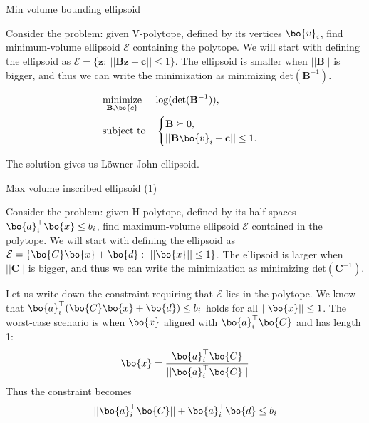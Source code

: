 \documentclass{beamer}
\begin{document}
\begin{frame}{Min volume bounding ellipsoid}
	\begin{flushleft}
		
		Consider the problem: given V-polytope, defined by its vertices $\bo{v}_i$, find minimum-volume ellipsoid $\mathcal{E}$ containing the polytope. We will start with defining the ellipsoid as $\mathcal{E} = \{ \mathbf{z}: \ || \mathbf{B}\mathbf{z} + \mathbf{c} || \leq 1 \}$. The ellipsoid is smaller when $|| \mathbf{B} ||$ is bigger, and thus we can write the minimization as minimizing $\text{det} (\mathbf{B}^{-1}) $.
		
\begin{equation}
	\begin{aligned}
		& \underset{\mathbf{B}, \bo{c}}{\text{minimize}}
		& & \text{log} (\text{det} (\mathbf{B}^{-1}) ), \\
		& \text{subject to}
		& & \begin{cases}
			\mathbf{B} \succeq 0, \\
			|| \mathbf{B} \bo{v}_i + \mathbf{c} || \leq 1.
		\end{cases}
	\end{aligned}
\end{equation}

The solution gives us L\"owner-John ellipsoid.
		
	\end{flushleft}
\end{frame}



\begin{frame}{Max volume inscribed ellipsoid (1)}
	\begin{flushleft}
		
		Consider the problem: given H-polytope, defined by its half-spaces $\bo{a}_i^\top \bo{x} \leq b_i$, find maximum-volume ellipsoid $\mathcal{E}$ contained in the polytope. We will start with defining the ellipsoid as $\mathcal{E} = \{ \bo{C}\bo{x} + \bo{d}: \ || \bo{x} || \leq 1 \}$. The ellipsoid is larger when $|| \mathbf{C} ||$ is bigger, and thus we can write the minimization as minimizing $\text{det} (\mathbf{C}^{-1}) $.
		
		\bigskip
		
		Let us write down the constraint requiring that $\mathcal{E}$ lies in the polytope. We know that $\bo{a}_i^\top (\bo{C}\bo{x} + \bo{d}) \leq b_i$ holds for all $|| \bo{x} || \leq 1$. The worst-case scenario is when $\bo{x}$ aligned with $\bo{a}_i^\top \bo{C}$ and has length 1:
		\begin{equation}
			\bo{x} = \frac{\bo{a}_i^\top \bo{C}}{|| \bo{a}_i^\top \bo{C} ||}
		\end{equation}
		Thus the constraint becomes
		\begin{equation}
			 || \bo{a}_i^\top \bo{C} || + \bo{a}_i^\top\bo{d} \leq b_i
		\end{equation}
		
	\end{flushleft}
\end{frame}
\end{document}
